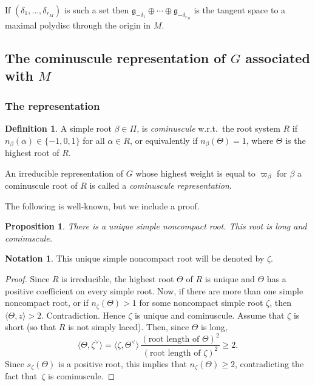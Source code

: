 \documentclass[10pt]{amsart}
\let\oldvee\vee
\renewcommand{\vee}{{\scriptscriptstyle\oldvee}}
\theoremstyle{plain}
\newtheorem{prop}[theo]{Proposition}
\theoremstyle{definition}
\newtheorem{defi}[theo]{Definition}
\newtheorem{nota}[theo]{Notation}
\let\la\langle
\let\ra\rangle
\newcommand{\fgg}{\mathfrak{g}}
\newcommand{\rkm}{{r_M}}
\newcommand{\scal}[1]{\langle #1 \rangle}
\let\Subsection\subsection\let\Subsubsection\subsubsection
\begin{document}
If $(\delta_1,\ldots, \delta_\rkm)$ is such a set then
$\fgg_{-\delta_1}\oplus\cdots\oplus\fgg_{-\delta_\rkm}$ is the tangent space to a maximal polydisc through the
origin in $M$.

\Subsection{The cominuscule representation of $G$ associated with $M$}
\label{subsec:minuscule-rep}

\Subsubsection{The representation}

\begin{defi}
A simple root $\beta\in \Pi$, is \emph{cominuscule} w.r.t.\ the root system $R$ if
$n_\beta(\alpha)\in\{-1,0,1\}$ for all $\alpha\in R$, or equivalently if $n_\beta(\Theta)=1$, where $\Theta$ is
the highest root of $R$.

An irreducible representation of $G$ whose highest weight is equal to $\varpi_\beta$ for $\beta$
a cominuscule root of $R$ is called a \emph{cominuscule representation}.
\end{defi}

The following is well-known, but we include a proof.

\begin{prop}
\label{prop:zeta}
There is a unique simple noncompact root. This root is long and cominuscule.
\end{prop}

\begin{nota}\label{nota:zeta}
This unique simple noncompact root will be denoted by $\zeta$.
\end{nota}

\begin{proof}
Since $R$ is
irreducible, the highest root $\Theta$ of $R$ is unique and $\Theta$ has a positive
coefficient on every simple root. Now, if there are more than one simple noncompact root, or if
$n_\zeta(\Theta)>1$ for some
noncompact simple root $\zeta$, then
$\la\Theta,z\ra>2$. Contradiction. Hence $\zeta$ is unique and cominuscule.
Assume that $\zeta$ is short (so that $R$ is not simply laced). Then, since $\Theta$ is long,
$$\scal{\Theta,\zeta^\vee}=\scal{\zeta,\Theta^\vee} \, \frac{(\text{root length of }\Theta)^2}{(\text{root length of }\zeta)^2}
\geq 2.$$
Since $s_\zeta(\Theta)$ is a positive root, this implies that $n_\zeta(\Theta) \geq 2$, contradicting the
fact that~$\zeta$ is cominuscule.
\end{proof}
\end{document}
